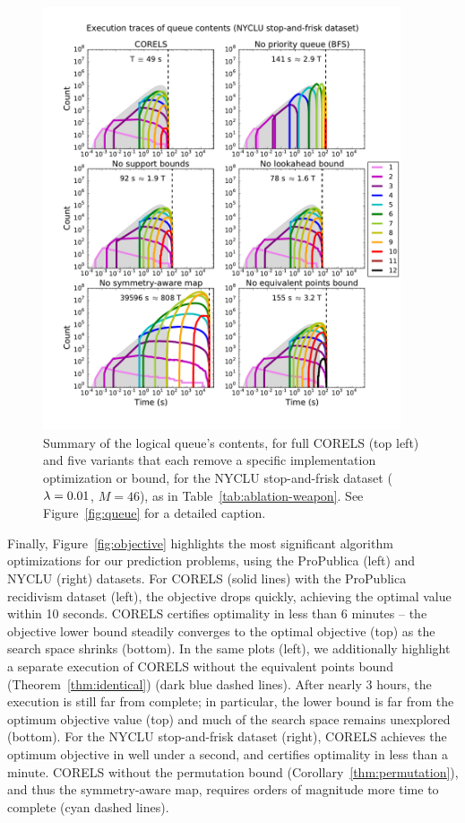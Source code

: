 \begin{figure}[t!]
\begin{center}
\includegraphics[trim={15mm 20mm 5mm 25mm},
width=0.94\textwidth]{figs/weapon_ablation-queue.pdf}
\end{center}
\vspace{-5mm}
\caption{Summary of the logical queue's contents, for full CORELS (top left)
and five variants that each remove a specific implementation optimization or bound,
for the NYCLU stop-and-frisk dataset (${{\lambda} = 0.01}$, ${M = 46}$), as in Table~\ref{tab:ablation-weapon}.
%
See Figure~\ref{fig:queue} for a detailed caption.
}
\label{fig:queue-weapon}
\end{figure}

Finally, Figure~\ref{fig:objective} highlights the most significant
algorithm optimizations for our prediction problems,
using the ProPublica (left) and NYCLU (right) datasets.
%
For CORELS (solid lines) with the ProPublica recidivism dataset (left),
the objective drops quickly, achieving the optimal value within 10 seconds.
CORELS certifies optimality in less than 6 minutes --
the objective lower bound steadily converges to the optimal objective (top)
as the search space shrinks (bottom).
%
In the same plots (left), we additionally highlight
a separate execution of CORELS without the equivalent points bound
(Theorem~\ref{thm:identical}) (dark blue dashed lines).
%
After nearly 3 hours, the execution is still far from complete;
in particular, the lower bound is far from the optimum objective value (top)
and much of the search space remains unexplored (bottom).
%
For the NYCLU stop-and-frisk dataset (right),
CORELS achieves the optimum objective in well under a second,
and certifies optimality in less than a minute.
%
CORELS without the permutation bound (Corollary~\ref{thm:permutation}),
and thus the symmetry-aware map,
requires orders of magnitude more time to complete (cyan dashed lines).

